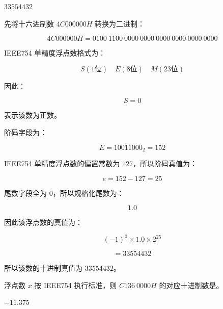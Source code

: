 \begin{answer}
$33554432$
\end{answer}

\begin{analysisenv}
先将十六进制数 $4C000000H$ 转换为二进制：

\[
4C000000H =
0100\ 1100\ 0000\ 0000\ 0000\ 0000\ 0000\ 0000
\]

IEEE754 单精度浮点数格式为：

\[
S(1\text{位}) \quad E(8\text{位}) \quad M(23\text{位})
\]

因此：

\[
S = 0
\]

表示该数为正数。

阶码字段为：

\[
E = 10011000_2 = 152
\]

IEEE754 单精度浮点数的偏置常数为 $127$，所以阶码真值为：

\[
e = 152 - 127 = 25
\]

尾数字段全为 $0$，所以规格化尾数为：

\[
1.0
\]

因此该浮点数的真值为：

\[
(-1)^0 \times 1.0 \times 2^{25}
\]

\[
= 33554432
\]

所以该数的十进制真值为 $33554432$。
\end{analysisenv}

\begin{question}
浮点数 $x$ 按 IEEE754 执行标准，则 $C136\ 0000H$ 的对应十进制数是\underline{\hspace{3cm}}。
\end{question}

\begin{answer}
$-11.375$
\end{answer}

